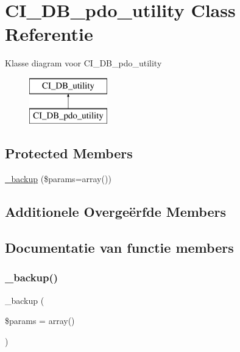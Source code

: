 \hypertarget{class_c_i___d_b__pdo__utility}{}\section{C\+I\+\_\+\+D\+B\+\_\+pdo\+\_\+utility Class Referentie}
\label{class_c_i___d_b__pdo__utility}
Klasse diagram voor C\+I\+\_\+\+D\+B\+\_\+pdo\+\_\+utility\begin{figure}[H]
\begin{center}
\leavevmode
\includegraphics[height=2.000000cm]{class_c_i___d_b__pdo__utility}
\end{center}
\end{figure}
\subsection*{Protected Members}
\begin{DoxyCompactItemize}
\item 
\mbox{\hyperlink{class_c_i___d_b__pdo__utility_a30f3053d2c82e7562349924363507afa}{\+\_\+backup}} (\$params=array())
\end{DoxyCompactItemize}
\subsection*{Additionele Overge\"{e}rfde Members}


\subsection{Documentatie van functie members}
\mbox{\label{class_c_i___d_b__pdo__utility_a30f3053d2c82e7562349924363507afa}} 
\subsubsection{\texorpdfstring{\_backup()}{\_backup()}}
{\footnotesize\ttfamily \+\_\+backup (\begin{DoxyParamCaption}\item[{}]{\$params = {\ttfamily array()} }\end{DoxyParamCaption})\hspace{0.3cm}{\ttfamily [protected]}}

